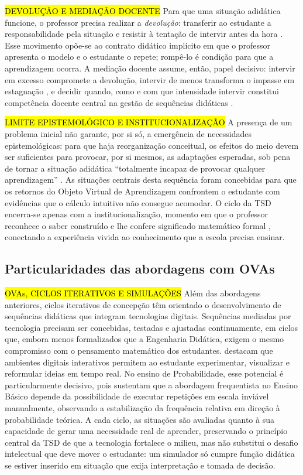 {\hl {DEVOLUÇÃO E MEDIAÇÃO DOCENTE} Para que uma situação adidática funcione, o professor precisa realizar a \emph{devolução}: transferir ao estudante a responsabilidade pela situação e resistir à tentação de intervir antes da hora \cite[p.~31]{brousseau2002}. Esse movimento opõe-se ao contrato didático implícito em que o professor apresenta o modelo e o estudante o repete; rompê-lo é condição para que a aprendizagem ocorra. A mediação docente assume, então, papel decisivo: intervir em excesso compromete a devolução, intervir de menos transforma o impasse em estagnação \cite{brousseau2002}, e decidir quando, como e com que intensidade intervir constitui competência docente central na gestão de sequências didáticas \cite[p.~159]{artigue2014}.

\hl{LIMITE EPISTEMOLÓGICO E INSTITUCIONALIZAÇÃO} A presença de um problema inicial não garante, por si só, a emergência de necessidades epistemológicas: para que haja reorganização conceitual, os efeitos do meio devem ser suficientes para provocar, por si mesmos, as adaptações esperadas, sob pena de tornar a situação adidática ``totalmente incapaz de provocar qualquer aprendizagem'' \cite[p.~58, tradução nossa]{brousseau2002}. As situações centrais desta sequência foram concebidas para que os retornos do Objeto Virtual de Aprendizagem confrontem o estudante com evidências que o cálculo intuitivo não consegue acomodar. O ciclo da TSD encerra-se apenas com a institucionalização, momento em que o professor reconhece o saber construído e lhe confere significado matemático formal \cite[p.~56]{brousseau1997}, conectando a experiência vivida ao conhecimento que a escola precisa ensinar.

\subsection{Particularidades das abordagens com OVAs}

\hl {OVAs, CICLOS ITERATIVOS E SIMULAÇÕES} Além das abordagens anteriores, ciclos iterativos de concepção têm orientado o desenvolvimento de sequências didáticas que integram tecnologias digitais. Sequências mediadas por tecnologia precisam ser concebidas, testadas e ajustadas continuamente, em ciclos que, embora menos formalizados que a Engenharia Didática, exigem o mesmo compromisso com o pensamento matemático dos estudantes.  destacam que ambientes digitais interativos permitem ao estudante experimentar, visualizar e reformular ideias em tempo real. No ensino de Probabilidade, esse potencial é particularmente decisivo, pois  sustentam que a abordagem frequentista no Ensino Básico depende da possibilidade de executar repetições em escala inviável manualmente, observando a estabilização da frequência relativa em direção à probabilidade teórica. A cada ciclo, as situações são avaliadas quanto à sua capacidade de gerar uma necessidade real de aprender, preservando o princípio central da TSD de que a tecnologia fortalece o milieu, mas não substitui o desafio intelectual que deve mover o estudante: um simulador só cumpre função didática se estiver inserido em situação que exija interpretação e tomada de decisão.

}
